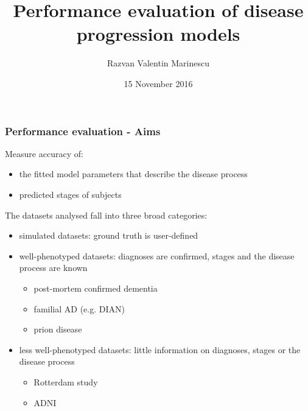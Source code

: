 \documentclass[10pt,xcolor=table]{beamer}
\title{Performance evaluation of disease progression models}
\author{Razvan Valentin Marinescu}
\institute{Center for Medical Image Computing, University College London}
\date{15 November 2016}
\begin{document}
 
\frame{\titlepage}
 


\begin{frame}
\frametitle{Performance evaluation - Aims}

Measure accuracy of: 
\begin{itemize}
  \item \textcolor{parCol}{the fitted model parameters that describe the disease process}
  \item \textcolor{stCol}{predicted stages of subjects}
\end{itemize}

The datasets analysed fall into three broad categories:
\begin{itemize}
 \item simulated datasets: ground truth is user-defined
 \item well-phenotyped datasets: diagnoses are confirmed, stages and the disease process are known
 \begin{itemize}
      \item post-mortem confirmed dementia
      \item familial AD (e.g. DIAN)
      \item prion disease 
 \end{itemize} 
 \item less well-phenotyped datasets: little information on diagnoses, stages or the disease process
 \begin{itemize}
      \item Rotterdam study
      \item ADNI
 \end{itemize} 
 
\end{itemize}

\end{frame}
\end{document}
